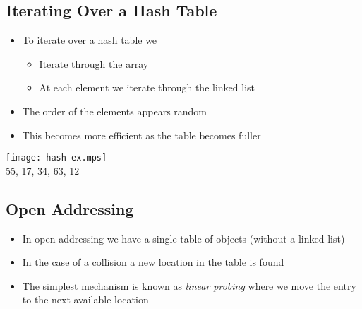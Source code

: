 \begin{slide}
\section{Iterating Over a Hash Table}

\begin{PauseHighLight}
  \begin{minipage}{12cm}
    \raggedright
  \begin{itemize}
  \item To iterate over a hash table we
    \begin{itemize}
    \item Iterate through the array\pause
    \item At each element we iterate through the linked list\pause
    \end{itemize}
  \item The order of the elements appears random\pause
  \item This becomes more efficient as the table becomes fuller\pause 
  \end{itemize}
  \end{minipage}\hfill
  \begin{minipage}{10cm}
    \texttt{[image: hash-ex.mps]}\\
    55, 17, 34, 63, 12
  \end{minipage}
\end{PauseHighLight}

\end{slide}


\Outline %

\begin{slide}
\section{Open Addressing}

\begin{PauseHighLight}
  \begin{itemize}
  \item In open addressing we have a single table of objects (without a
    linked-list)\pause
  \item In the case of a collision a new location in the table is
    found\pause 
  \item The simplest mechanism is known as \emph{linear probing} where
    we move the entry to the next available location\pause
  \end{itemize}
\end{PauseHighLight}

\end{slide}

